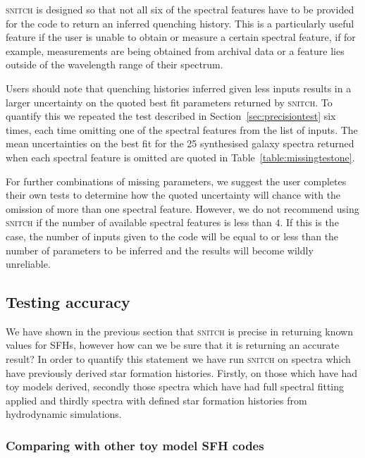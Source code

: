 \documentclass[useAMS,usenatbib]{mn2e}
\begin{document}
\textsc{snitch} is designed so that not all six of the spectral features have to be provided for the code to return an inferred quenching history. This is a particularly useful feature if the user is unable to obtain or measure a certain spectral feature, if for example, measurements are being obtained from archival data or a feature lies outside of the wavelength range of their spectrum. 

Users should note that quenching histories inferred given less inputs results in a larger uncertainty on the quoted best fit parameters returned by \textsc{snitch}. To quantify this we repeated the test described in Section~\ref{sec:precisiontest} six times, each time omitting one of the spectral features from the list of inputs. The mean uncertainties on the best fit for the 25 synthesised galaxy spectra returned when each spectral feature is omitted are quoted in Table~\ref{table:missingtestone}. 

For further combinations of missing parameters, we suggest the user completes their own tests to determine how the quoted uncertainty will chance with the omission of more than one spectral feature. However, we do not recommend using \textsc{snitch} if the number of available spectral features is less than $4$. If this is the case, the number of inputs given to the code will be equal to or less than the number of parameters to be inferred and the results will become wildly unreliable. 

\subsection{Testing accuracy}\label{sec:accuracytest}

We have shown in the previous section that \textsc{snitch} is precise in returning known values for SFHs, however how can we be sure that it is returning an accurate result? In order to quantify this statement we have run \textsc{snitch} on spectra which have previously derived star formation histories. Firstly, on those which have had toy models derived, secondly those spectra which have had full spectral fitting applied and thirdly spectra with defined star formation histories from hydrodynamic simulations.

\subsubsection{Comparing with other toy model SFH codes} 
\end{document}

